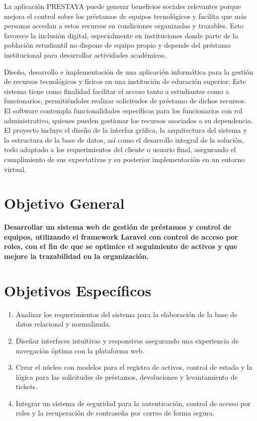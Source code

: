 La aplicación PRESTAYA puede generar beneficios sociales relevantes porque mejora el control sobre los préstamos de equipos tecnológicos y facilita que más personas accedan a estos recursos en condiciones organizadas y trazables. Esto favorece la inclusión digital, especialmente en instituciones donde parte de la población estudiantil no dispone de equipo propio y depende del préstamo institucional para desarrollar actividades académicas. \cite{estefano2026} 

Diseño, desarrollo e implementación de una aplicación informática para la gestión de recursos tecnológicos y físicos en una institución de educación superior. Este sistema tiene como finalidad facilitar el acceso tanto a estudiantes como a funcionarios, permitiéndoles realizar solicitudes de préstamo de dichos recursos.
El software contempla funcionalidades específicas para los funcionarios con rol administrativo, quienes pueden gestionar los recursos asociados a su dependencia. El proyecto incluye el diseño de la interfaz gráfica, la arquitectura del sistema y la estructura de la base de datos, así como el desarrollo integral de la solución, todo adaptado a los requerimientos del cliente o usuario final, asegurando el cumplimiento de sus expectativas y su posterior implementación en un entorno virtual. \cite{hamilton2025}

\section{Objetivo General}
\textbf{Desarrollar un sistema web de gestión de préstamos y control de equipos, utilizando el framework Laravel con control de acceso por roles, con el fin de que se optimice el seguimiento de activos y que mejore la trazabilidad en la organización.}
\section{Objetivos Específicos}
\begin{enumerate}
	\item Analizar los requerimientos del sistema para la elaboración de la base de datos relacional y normalizada.
	\item Diseñar interfaces intuitivas y responsivas asegurando una experiencia de navegación óptima con la plataforma web.
	\item Crear el núcleo con modelos para el registro de activos, control de estado y la lógica para las solicitudes de préstamos, devoluciones y levantamiento de tickets.
	\item Integrar un sistema de seguridad para la autenticación, control de acceso por roles y la recuperación de contraseña por correo de forma segura.

\end{enumerate}

